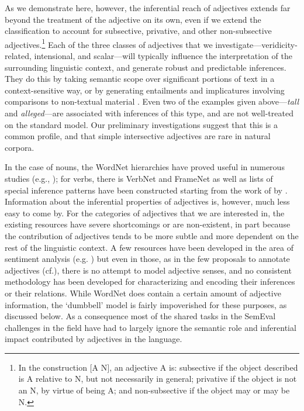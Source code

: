 \documentclass[10pt]{article}
\begin{document}
As we demonstrate here, however,  the inferential reach of adjectives extends far beyond the treatment of the adjective on its own,  even if we extend the classification to  account for subsective, privative, and other non-subsective adjectives.\footnote{
In the construction $[$A N$]$, an adjective A is:  {\sc subsective} if the object described is A relative to N, but not necessarily in general; {\sc privative} if the object 
is not an N, by virtue of being A; and 
{\sc non-subsective} if the object may or may be N.}
Each of the three classes of adjectives that we investigate---veridicity-related, intensional, and scalar---will typically influence the interpretation  of the surrounding linguistic context, and generate robust and predictable inferences.  They do this by taking semantic scope over significant portions of text in a context-sensitive way, or by generating entailments and implicatures involving comparisons to non-textual material  
\cite{lassiter14adjectives}. 
Even two of the examples given above---\emph{tall} and \emph{alleged}---are associated with inferences of this type, and are not well-treated on the standard model. Our preliminary investigations suggest that this is a common profile, and that simple intersective  adjectives are rare in natural corpora.
 
In the case of nouns, the WordNet hierarchies have proved useful in numerous studies (e.g., \cite{snow04}); for verbs, there is VerbNet and FrameNet as well as lists of special inference patterns have been constructed starting from the work of \cite{kiparsky+kiparsky:1970,karttunen:1971} by \cite{nairn+condoravdi+karttunen:2006,sauri:2008phd,factbank:2009,lotan:2012}. Information about the inferential properties of adjectives is, however, much less easy to come by. For the categories of adjectives that we are interested in, the existing resources have severe shortcomings or are non-existent, in part because the contribution of adjectives tends to be more subtle and more dependent on the rest of the linguistic context. A few resources have been developed in the area of sentiment analysis (e.g. \cite{Hatzivassiloglou97predictingthe}) but even in those, as in the few proposals to annotate adjectives (cf.\cite{Raskin95lexicalsemantics}), there is no attempt to model adjective senses, and no consistent methodology has been developed for characterizing and encoding their inferences or their relations. While WordNet does contain a certain amount of adjective information, the `dumbbell' model is fairly impoverished for these purposes, as discussed below. As a consequence most of the shared tasks in the SemEval challenges in the field have had to largely ignore the semantic role and inferential impact contributed by adjectives in the language.
\end{document}
